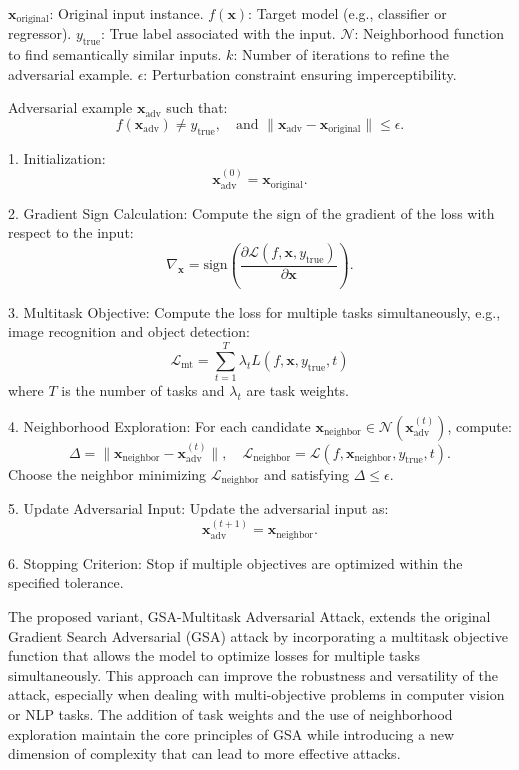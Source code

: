 $\mathbf{x}_{\text{original}}$: Original input instance.  
$f(\mathbf{x})$: Target model (e.g., classifier or regressor).  
$y_{\text{true}}$: True label associated with the input.  
$\mathcal{N}$: Neighborhood function to find semantically similar inputs.  
$k$: Number of iterations to refine the adversarial example.  
$\epsilon$: Perturbation constraint ensuring imperceptibility.

Adversarial example $\mathbf{x}_{\text{adv}}$ such that:  
\[ 
f(\mathbf{x}_{\text{adv}}) \neq y_{\text{true}}, \quad \text{and } \|\mathbf{x}_{\text{adv}} - \mathbf{x}_{\text{original}}\| \leq \epsilon.
\]

1. Initialization:  
   \[
   \mathbf{x}_{\text{adv}}^{(0)} = \mathbf{x}_{\text{original}}.
   \]

2. Gradient Sign Calculation:  
   Compute the sign of the gradient of the loss with respect to the input:  
   \[
   \nabla_{\mathbf{x}} = \text{sign}\left(\frac{\partial \mathcal{L}(f, \mathbf{x}, y_{\text{true}})}{\partial \mathbf{x}}\right).
   \]

3. Multitask Objective:  
   Compute the loss for multiple tasks simultaneously, e.g., image recognition and object detection:  
   \[
   \mathcal{L}_{\text{mt}} = \sum_{t=1}^{T} \lambda_t L(f, \mathbf{x}, y_{\text{true}}, t)
   \]
   where $T$ is the number of tasks and $\lambda_t$ are task weights.

4. Neighborhood Exploration:  
   For each candidate $\mathbf{x}_{\text{neighbor}} \in \mathcal{N}(\mathbf{x}_{\text{adv}}^{(t)})$, compute:  
   \[
   \Delta = \|\mathbf{x}_{\text{neighbor}} - \mathbf{x}_{\text{adv}}^{(t)}\|, \quad \mathcal{L}_{\text{neighbor}} = \mathcal{L}(f, \mathbf{x}_{\text{neighbor}}, y_{\text{true}}, t).
   \]
   Choose the neighbor minimizing $\mathcal{L}_{\text{neighbor}}$ and satisfying $\Delta \leq \epsilon$.

5. Update Adversarial Input:  
   Update the adversarial input as:  
   \[
   \mathbf{x}_{\text{adv}}^{(t+1)} = \mathbf{x}_{\text{neighbor}}.
   \]

6. Stopping Criterion:  
   Stop if multiple objectives are optimized within the specified tolerance.

The proposed variant, GSA-Multitask Adversarial Attack, extends the original Gradient Search Adversarial (GSA) attack by incorporating a multitask objective function that allows the model to optimize losses for multiple tasks simultaneously. This approach can improve the robustness and versatility of the attack, especially when dealing with multi-objective problems in computer vision or NLP tasks. The addition of task weights and the use of neighborhood exploration maintain the core principles of GSA while introducing a new dimension of complexity that can lead to more effective attacks.